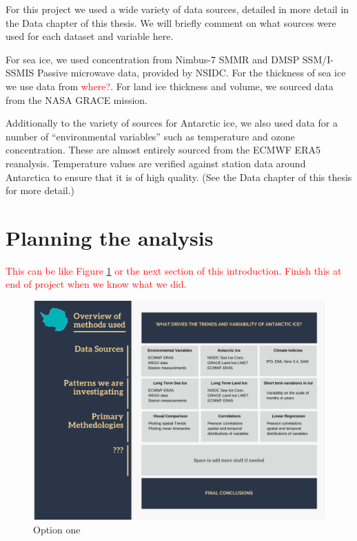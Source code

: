 \documentclass[../main.tex]{subfiles}
\begin{document}
For this project we used a wide variety of data sources, detailed in more detail in the Data chapter of this thesis. We will briefly comment on what sources were used for each dataset and variable here.

For sea ice, we used concentration from Nimbus-7 SMMR and DMSP SSM/I-SSMIS Passive microwave data, provided by NSIDC. For the thickness of sea ice we use data from \textcolor{red}{where?}. For land ice thickness and volume, we sourced data from the NASA GRACE mission. 

Additionally to the variety of sources for Antarctic ice, we also used data for a number of ``environmental variables'' such as temperature and ozone concentration. These are almost entirely sourced from the ECMWF ERA5 reanalysis. Temperature values are verified against station data around Antarctica to ensure that it is of high quality. (See the Data chapter of this thesis for more detail.)

\section{Planning the analysis}
\textcolor{red}{This can be like Figure \ref{fig:flowchart} or the next section of this introduction. Finish this at end of project when we know what we did.}
\begin{figure}[hbt!]
    \centering
    \includegraphics[width=\textwidth]{images/flowchart/Flowchart of analysis and methods.pdf}
    \caption{Option one}
    \label{fig:flowchart}
\end{figure}
\end{document}
